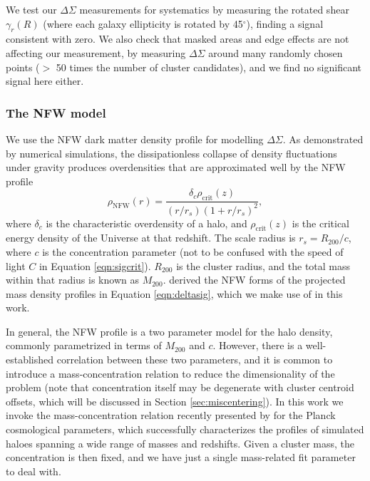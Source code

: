 We test our $\Delta\Sigma$ measurements for systematics by measuring the rotated shear $\gamma_r(R)$ (where each galaxy ellipticity is rotated by 45$^{\circ}$), finding a signal consistent with zero. We also check that masked areas and edge effects are not affecting our measurement, by measuring $\Delta\Sigma$ around many randomly chosen points ($>$ 50 times the number of cluster candidates), and we find no significant signal here either.

\subsubsection{The \ac{NFW} model}
\label{sec:nfw}

We use the \acf{NFW} dark matter density profile \citep{nfw97} for modelling $\Delta\Sigma$. As demonstrated by numerical simulations, the dissipationless collapse of density fluctuations under gravity produces overdensities that are approximated well by the \ac{NFW} profile
\begin{equation}
\rho_{\mathrm{NFW}}(r) = \frac{\delta_c \rho_{\mathrm{crit}}(z)}{(r/r_s)(1+r/r_s)^2},
\end{equation}
where $\delta_c$ is the characteristic overdensity of a halo, and $\rho_{\mathrm{crit}}(z)$ is the critical energy density of the Universe at that redshift. The scale radius is $r_s = R_{200}/c$, where $c$ is the concentration parameter (not to be confused with the speed of light $C$ in Equation \ref{eqn:sigcrit}). $R_{200}$ is the cluster radius, and the total mass within that radius is known as $M_{200}$. \citet{Wright00} derived the \ac{NFW} forms of the projected mass density profiles in Equation \ref{eqn:deltasig}, which we make use of in this work.

In general, the \ac{NFW} profile is a two parameter model for the halo density, commonly parametrized in terms of $M_{200}$ and $c$. However, there is a well-established correlation between these two parameters, and it is common to introduce a mass-concentration relation to reduce the dimensionality of the problem (note that concentration itself may be degenerate with cluster centroid offsets, which will be discussed in Section \ref{sec:miscentering}). In this work we invoke the mass-concentration relation recently presented by \citet{Dutton14} for the Planck cosmological parameters, which successfully characterizes the profiles of simulated haloes spanning a wide range of masses and redshifts. Given a cluster mass, the concentration is then fixed, and we have just a single mass-related fit parameter to deal with.



